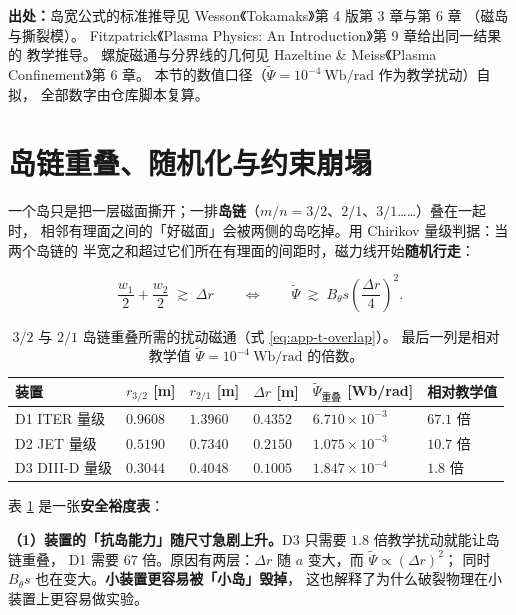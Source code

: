 {\footnotesize
\textbf{出处：}岛宽公式的标准推导见 Wesson《Tokamaks》第 4 版第 3 章与第 6 章
（磁岛与撕裂模）。
Fitzpatrick《Plasma Physics: An Introduction》第 9 章给出同一结果的
教学推导。
螺旋磁通与分界线的几何见 Hazeltine \& Meiss《Plasma Confinement》第 6 章。
本节的数值口径（$\tilde\Psi=10^{-4}\ \mathrm{Wb/rad}$ 作为教学扰动）自拟，
全部数字由仓库脚本复算。
}

\section{岛链重叠、随机化与约束崩塌}
\label{sec:app-t-overlap}

一个岛只是把一层磁面撕开；一排\textbf{岛链}（$m/n=3/2$、$2/1$、$3/1$……）叠在一起时，
相邻有理面之间的「好磁面」会被两侧的岛吃掉。用 Chirikov 量级判据：当两个岛链的
半宽之和超过它们所在有理面的间距时，磁力线开始\textbf{随机行走}：

\begin{equation}
\frac{w_1}{2}+\frac{w_2}{2}\;\gtrsim\;\Delta r
\qquad\Longleftrightarrow\qquad
\tilde\Psi\;\gtrsim\;B_\theta s\left(\frac{\Delta r}{4}\right)^2 .
\label{eq:app-t-overlap}
\end{equation}

\begin{table}[htbp]
  \centering
  \caption{$3/2$ 与 $2/1$ 岛链重叠所需的扰动磁通（式 \eqref{eq:app-t-overlap}）。
    最后一列是相对教学值 $\tilde\Psi=10^{-4}\ \mathrm{Wb/rad}$ 的倍数。}
  \label{tab:app-t-overlap}
  \begin{tabular}{@{}p{3.0cm}p{1.7cm}p{1.7cm}p{1.6cm}p{2.8cm}p{2.0cm}@{}}
    \toprule
    装置 & $r_{3/2}$ [m] & $r_{2/1}$ [m] & $\Delta r$ [m] & $\tilde\Psi_{\text{重叠}}$ [Wb/rad] & 相对教学值 \\
    \midrule
    D1 ITER 量级 & $0.9608$ & $1.3960$ & $0.4352$ & $6.710\times10^{-3}$ & $67.1$ 倍 \\
    D2 JET 量级 & $0.5190$ & $0.7340$ & $0.2150$ & $1.075\times10^{-3}$ & $10.7$ 倍 \\
    D3 DIII-D 量级 & $0.3044$ & $0.4048$ & $0.1005$ & $1.847\times10^{-4}$ & $1.8$ 倍 \\
    \bottomrule
  \end{tabular}
\end{table}

表 \ref{tab:app-t-overlap} 是一张\textbf{安全裕度表}：

\textbf{（1）装置的「抗岛能力」随尺寸急剧上升。}D3 只需要 $1.8$ 倍教学扰动就能让岛链重叠，
D1 需要 $67$ 倍。原因有两层：$\Delta r$ 随 $a$ 变大，而 $\tilde\Psi\propto(\Delta r)^2$；
同时 $B_\theta s$ 也在变大。\textbf{小装置更容易被「小岛」毁掉}，
这也解释了为什么破裂物理在小装置上更容易做实验。

